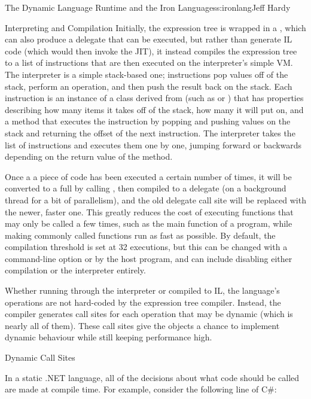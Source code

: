 \begin{aosachapter}{The Dynamic Language Runtime and the Iron Languages}{s:ironlang}{Jeff Hardy}
\begin{aosasect1}{Interpreting and Compilation}
Initially, the expression tree is wrapped in a ,
which can also produce a delegate that can be executed, but rather than
generate IL code (which would then invoke the JIT), it instead compiles the
expression tree to a list of instructions that are then executed on the
interpreter's simple VM. The interpreter is a simple stack-based one;
instructions pop values off of the stack, perform an operation, and then push
the result back on the stack. Each instruction is an instance of a class
derived from  (such as
 or ) that has properties
describing how many items it takes off of the stack, how many it will put on,
and a  method that executes the instruction by popping and pushing
values on the stack and returning the offset of the next instruction. The
interpreter takes the list of instructions and executes them one by one,
jumping forward or backwards depending on the return value of the 
method.

Once a a piece of code has been executed a certain number of times, it will be
converted to a full  by calling
, then compiled to a 
delegate (on a background thread for a bit of parallelism), and the old
delegate call site will be replaced with the newer, faster one. This greatly
reduces the cost of executing functions that may only be called a few times,
such as the main function of a program, while making commonly called functions
run as fast as possible. By default, the compilation threshold is set at 32
executions, but this can be changed with a command-line option or by the host
program, and can include disabling either compilation or the interpreter 
entirely.

Whether running through the interpreter or compiled to IL, the language's
operations are not hard-coded by the expression tree compiler. Instead, the
compiler generates call sites for each operation that may be dynamic (which is
nearly all of them). These call sites give the objects a chance to implement
dynamic behaviour while still keeping performance high.

\end{aosasect1}

\begin{aosasect1}{Dynamic Call Sites}

In a static .NET language, all of the decisions about what code should be
called are made at compile time. For example, consider the following line of
C\#:


\end{aosasect1}
\end{aosachapter}
